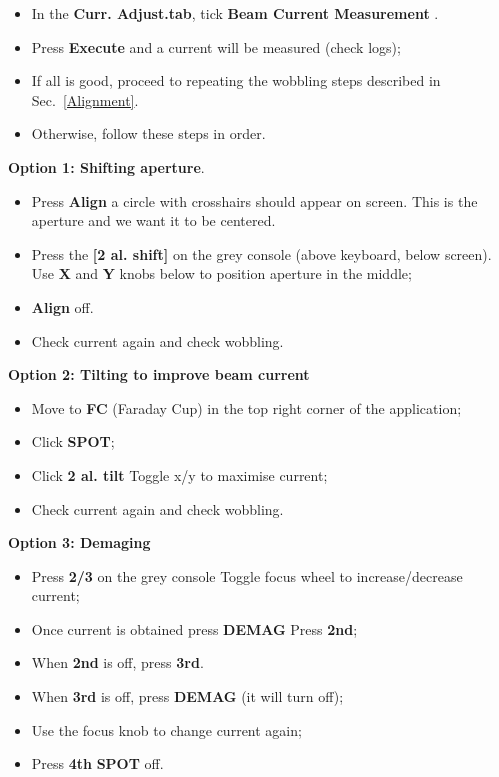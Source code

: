 \begin{itemize}
\item In the \textbf{Curr.   Adjust.tab}, tick \textbf{Beam Current Measurement}
  .
\item Press \textbf{Execute} and a current will be measured (check logs);
\item  If all  is good,  proceed to  repeating the  wobbling steps  described in
  Sec.~\ref{Alignment}.
\item Otherwise, follow these steps in order.
\end{itemize}

\textbf{Option 1: Shifting aperture}.
\begin{itemize}
\item  Press \textbf{Align}  \ira  a  circle with  crosshairs  should appear  on
  screen. This is the aperture and we want it to be centered.
\item Press  the \textbf{[2 al.   shift]} on  the grey console  (above keyboard,
  below screen).  Use \textbf{X} and \textbf{Y} knobs below to position aperture
  in the middle;
\item \textbf{Align} off.
\item Check current again and check wobbling.
\end{itemize}

\textbf{Option 2: Tilting to improve beam current}
\begin{itemize}
\item  Move  to  \textbf{FC} (Faraday  Cup)  in  the  top  right corner  of  the
  application;
\item Click \textbf{SPOT};
\item Click \textbf{2 al. tilt} \ira Toggle x/y to maximise current;
\item Check current again and check wobbling.
\end{itemize}

\textbf{Option 3: Demaging}
\begin{itemize}
\item  Press  \textbf{2/3} on  the  grey  console  \ira  Toggle focus  wheel  to
  increase/decrease current;
\item Once current is obtained press \textbf{DEMAG} \ira Press \textbf{2nd};
\item When \textbf{2nd} is off, press \textbf{3rd}.
\item When \textbf{3rd} is off, press \textbf{DEMAG} (it will turn off);
\item Use the focus knob to change current again;
\item Press \textbf{4th} \ira \textbf{SPOT} off.
\end{itemize}

